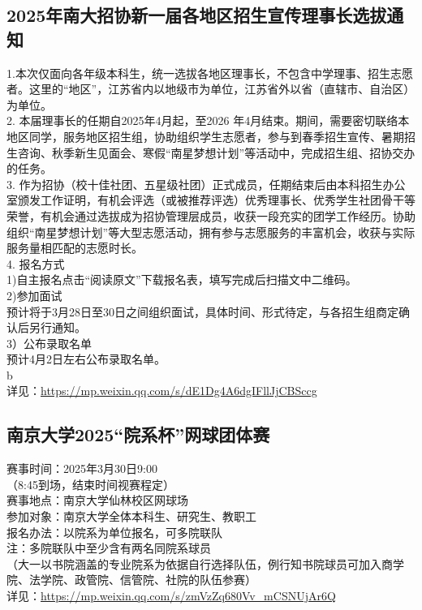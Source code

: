 \documentclass[letterpaper, 12pt]{article}
\begin{document}
\begin{multicols}{2}
\subsection{2025年南大招协新一届各地区招生宣传理事长选拔通知}
1.本次仅面向各年级本科生，统一选拔各地区理事长，不包含中学理事、招生志愿者。这里的“地区”，江苏省内以地级市为单位，江苏省外以省（直辖市、自治区）为单位。
\\2. 本届理事长的任期自2025年4月起，至2026 年4月结束。期间，需要密切联络本地区同学，服务地区招生组，协助组织学生志愿者，参与到春季招生宣传、暑期招生咨询、秋季新生见面会、寒假“南星梦想计划”等活动中，完成招生组、招协交办的任务。
\\3. 作为招协（校十佳社团、五星级社团）正式成员，任期结束后由本科招生办公室颁发工作证明，有机会评选（或被推荐评选）优秀理事长、优秀学生社团骨干等荣誉，有机会通过选拔成为招协管理层成员，收获一段充实的团学工作经历。协助组织“南星梦想计划”等大型志愿活动，拥有参与志愿服务的丰富机会，收获与实际服务量相匹配的志愿时长。
\\4. 报名方式
\\1)自主报名点击“阅读原文”下载报名表，填写完成后扫描文中二维码。
\\2)参加面试
\\预计将于3月28日至30日之间组织面试，具体时间、形式待定，与各招生组商定确认后另行通知。
\\3）公布录取名单
\\预计4月2日左右公布录取名单。
\\b
\\详见：\url{https://mp.weixin.qq.com/s/dE1Dg4A6dgIFllJjCBSccg}

\subsection{南京大学2025“院系杯”网球团体赛}
赛事时间：2025年3月30日9:00
\\（8:45到场，结束时间视赛程定）
\\赛事地点：南京大学仙林校区网球场
\\参加对象：南京大学全体本科生、研究生、教职工
\\报名办法：以院系为单位报名，可多院联队
\\注：多院联队中至少含有两名同院系球员
\\（大一以书院涵盖的专业院系为依据自行选择队伍，例行知书院球员可加入商学院、法学院、政管院、信管院、社院的队伍参赛）
\\详见：\url{https://mp.weixin.qq.com/s/zmVzZq680Vv_mCSNUjAr6Q}
\end{multicols}
\end{document}
